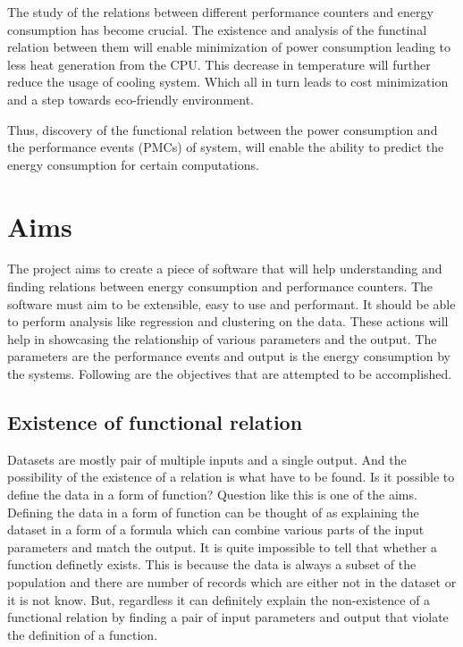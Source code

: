 The study of the relations between different performance counters and energy consumption has become crucial. The existence and analysis of the functinal relation between them will enable minimization of power consumption leading to less heat generation from the CPU. This decrease in temperature will further reduce the usage of cooling system. Which all in turn leads to cost minimization and a step towards eco-friendly environment.

Thus, discovery of the functional relation between the power consumption and the performance events (PMCs) of system, will enable the ability to predict the energy consumption for certain computations.

\section{Aims}

The project aims to create a piece of software that will help understanding and finding relations between energy consumption and performance counters. The software must aim to be extensible, easy to use and performant. It should be able to perform analysis like regression and clustering on the data. These actions will help in showcasing the relationship of various parameters and the output. The parameters are the performance events and output is the energy consumption by the systems. Following are the objectives that are attempted to be accomplished.

\subsection{Existence of functional relation}

Datasets are mostly pair of multiple inputs and a single output. And the possibility of the existence of a relation is what have to be found. Is it possible to define the data in a form of function? Question like this is one of the aims. Defining the data in a form of function can be thought of as explaining the dataset in a form of a formula which can combine various parts of the input parameters and match the output. It is quite impossible to tell that whether a function definetly exists. This is because the data is always a subset of the population and there are number of records which are either not in the dataset or it is not know. But, regardless it can definitely explain the non-existence of a functional relation by finding a pair of input parameters and output that violate the definition of a function.

